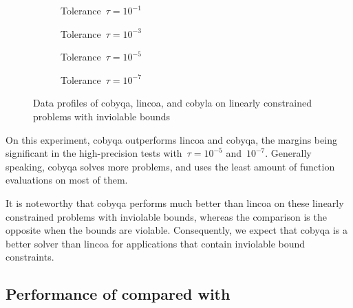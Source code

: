\begin{figure}[ht]
    \centering
    \begin{subfigure}[b]{0.49\textwidth}
        \centering
        \caption{Tolerance~$\tau = 10^{-1}$}
    \end{subfigure}
    \hfill
    \begin{subfigure}[b]{0.49\textwidth}
        \centering
        \caption{Tolerance~$\tau = 10^{-3}$}
    \end{subfigure}
    \begin{subfigure}[b]{0.49\textwidth}
        \centering
        \caption{Tolerance~$\tau = 10^{-5}$}
    \end{subfigure}
    \hfill
    \begin{subfigure}[b]{0.49\textwidth}
        \centering
        \caption{Tolerance~$\tau = 10^{-7}$}
    \end{subfigure}
    \caption[Data profiles on linearly constrained problems with bounds]{Data profiles of \gls{cobyqa}, \gls{lincoa}, and \gls{cobyla} on linearly constrained problems with inviolable bounds}
    \label{fig:data-linearly-constrained-problems-bounds}
\end{figure}

On this experiment, \gls{cobyqa} outperforms \gls{lincoa} and \gls{cobyqa}, the margins being significant in the high-precision tests with~$\tau = 10^{-5}$ and~$10^{-7}$.
Generally speaking, \gls{cobyqa} solves more problems, and uses the least amount of function evaluations on most of them.

It is noteworthy that \gls{cobyqa} performs much better than \gls{lincoa} on these linearly constrained problems with inviolable bounds, whereas the comparison is the opposite when the bounds are violable.
Consequently, we expect that \gls{cobyqa} is a better solver than \gls{lincoa} for applications that contain inviolable bound constraints.

\subsection{Performance of  compared with }


